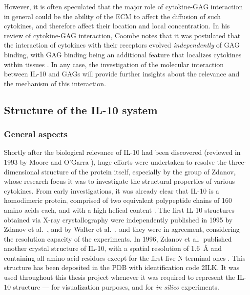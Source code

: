 However, it is often speculated that the major role of cytokine-GAG interaction
in general could be the ability of the ECM to affect the diffusion of such
cytokines, and therefore affect their location and local concentration. In his
review of cytokine-GAG interaction, Coombe notes that it was postulated that the
interaction of cytokines with their receptors evolved \textit{independently} of
GAG binding, with GAG binding being an additional feature that localizes
cytokines within tissues \cite{coombe_cytokine_gag_2008}. In any case, the
investigation of the molecular interaction between IL-10 and GAGs will provide
further insights about the relevance and the mechanism of this interaction.


\subsection{Structure of the IL-10 system}

\subsubsection{General aspects}
Shortly after the biological relevance of IL-10 had been discovered (reviewed in
1993 by Moore and O'Garra \cite{il10_first_review_1993}), huge efforts were
undertaken to resolve the three-dimensional structure of the protein itself,
especially by the group of Zdanov, whose research focus it was to investigate
the structural properties of various cytokines. From early investigations, it
was already clear that IL-10 is a homodimeric protein, comprised of two
equivalent polypeptide chains of 160 amino acids each, and with a high helical
content \cite{vieira_moore_il10homodimer_1991}. The first IL-10 structures
obtained via X-ray crystallography were independently published in 1995 by
Zdanov et al.\ \cite{Zdanov1995}, and by Walter et al.\
\cite{il10_crystal_walter_1995}, and they were in agreement, considering the
resolution capacity of the experiments. In 1996, Zdanov et al.\ published
another crystal structure of IL-10, with a spatial resolution of
\SI{1.6}{\angstrom} and containing all amino acid residues except for the first
five N-terminal ones \cite{Zdanov1996}. This structure has been deposited in the
PDB with identification code 2ILK. It was used throughout this thesis project
whenever it was required to represent the IL-10 structure --- for visualization
purposes, and for \textit{in silico} experiments.

